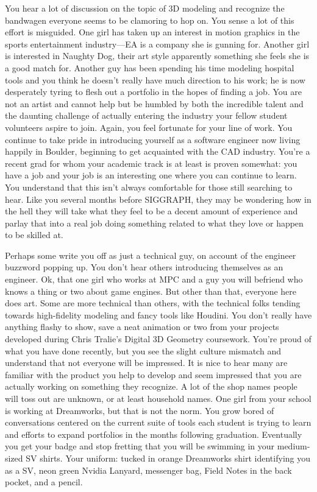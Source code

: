 \documentclass[../main.tex]{subfiles}
\begin{document}
You hear a lot of discussion on the topic of 3D modeling and recognize the bandwagen everyone seems to be clamoring to hop on. You sense a lot of this effort is misguided. One girl has taken up an interest in motion graphics in the sports entertainment industry---EA is a company she is gunning for. Another girl is interested in Naughty Dog, their art style apparently something she feels she is a good match for. Another guy has been spending his time modeling hospital tools and you think he doesn't really have much direction to his work; he is now desperately tyring to flesh out a portfolio in the hopes of finding a job. You are not an artist and cannot help but be humbled by both the incredible talent and the daunting challenge of actually entering the industry your fellow student volunteers aspire to join. Again, you feel fortunate for your line of work. You continue to take pride in introducing yourself as a software engineer now living happily in Boulder, beginning to get acquainted with the CAD industry. You're a recent grad for whom your academic track is at least is proven somewhat: you have a job and your job is an interesting one where you can continue to learn. You understand that this isn't always comfortable for those still searching to hear. Like you several months before SIGGRAPH, they may be wondering how in the hell they will take what they feel to be a decent amount of experience and parlay that into a real job doing something related to what they love or happen to be skilled at. 

Perhaps some write you off as just a technical guy, on account of the engineer buzzword popping up. You don't hear others introducing themselves as an engineer. Ok, that one girl who works at MPC and a guy you will befriend who knows a thing or two about game engines. But other than that, everyone here does art. Some are more technical than others, with the technical folks tending towards high-fidelity modeling and fancy tools like Houdini. You don't really have anything flashy to show, save a neat animation or two from your projects developed during Chris Tralie's Digital 3D Geometry coursework. You're proud of what you have done recently, but you see the slight culture mismatch and understand that not everyone will be impressed. It is nice to hear many are familiar with the product you help to develop and seem impressed that you are actually working on something they recognize. A lot of the shop names people will toss out are unknown, or at least household names. One girl from your school is working at Dreamworks, but that is not the norm. You grow bored of conversations centered on the current suite of tools each student is trying to learn and efforts to expand portfolios in the months following graduation. Eventually you get your badge and stop fretting that you will be swimming in your medium-sized SV shirts. Your uniform: tucked in orange Dreamworks shirt identifying you as a SV, neon green Nvidia Lanyard, messenger bag, Field Notes in the back pocket, and a pencil.
\end{document}
